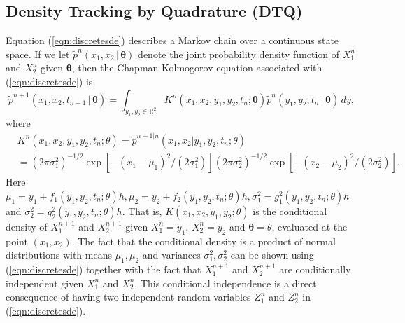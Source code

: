 \documentclass[graybox]{svmult}
\newcommand{\btheta}{\ensuremath{\boldsymbol{\theta}}}
\begin{document}
\subsection{Density Tracking by Quadrature (DTQ)}
\label{subsec:2-1}
Equation (\ref{eqn:discretesde}) describes a Markov chain over a continuous state space.  If we let $\widetilde{p}^n(x_1,x_2 \, | \, \btheta)$ denote the joint probability density function of $X_1^n$ and $X_2^n$ given $\btheta$, then the Chapman-Kolmogorov equation associated with (\ref{eqn:discretesde})  is
\begin{equation}
\label{eqn:chapman}
\widetilde{p}^{n+1}(x_1,x_2,t_{n+1} \, | \, \btheta) = \int_{y_1,y_2 \in \mathbb{R}^2} K^n (x_1,x_2,y_1,y_2,t_n; \btheta) \widetilde{p}^n(y_1,y_2, t_n \, | \, \btheta) \, dy,
\end{equation}
where
\begin{align}
&K^n(x_1,x_2,y_1,y_2,  t_n; \theta) = \widetilde{p}^{{n+1} | {n}}(x_1,x_2 | y_1,y_2, t_n;\theta) \nonumber\\
&= (2 \pi \sigma_1^2)^{-1/2} \exp \left[ -(x_1 - \mu_1)^2/(2 \sigma_1^2) \right] (2 \pi \sigma_2^2)^{-1/2} \exp \left[ -(x_2 - \mu_2)^2/(2 \sigma_2^2) \right]\nonumber.
\end{align}
Here $\mu_1 = y_1 + f_1(y_1,y_2,t_n; \theta) h,  \mu_2 = y_2 + f_2(y_1,y_2,t_n; \theta) h,  \sigma_1^2 = g_1^2(y_1,y_2,t_n; \theta) h$ and  $\sigma_2^2 = g_2^2(y_1,y_2,t_n; \theta) h$. That is, $K(x_1,x_2,y_1,y_2; \theta)$ is the conditional density of $X_1^{n+1}$ and $X_2^{n+1}$ given $X_1^n = y_1$, $X_2^n = y_2$ and $\btheta = \theta$, evaluated at the point $(x_1,x_2)$.  The fact that the conditional density is a product of normal distributions with means $\mu_1, \mu_2$ and variances $\sigma_1^2, \sigma_2^2$ can be shown using (\ref{eqn:discretesde}) together with the fact that $X_1^{n+1}$ and $X_2^{n+1}$ are conditionally independent given $X_1^n$ and $X_2^n$. This conditional independence is a direct consequence of having two independent random variables $Z_1^n$ and $Z_2^n$ in (\ref{eqn:discretesde}).
\end{document}
